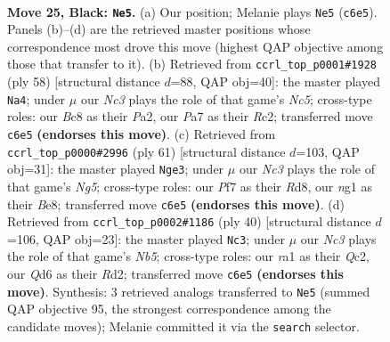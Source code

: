 \documentclass[11pt]{article}
\begin{document}
\clearpage

\begin{figure}[p]\centering
\begin{subfigure}{0.46\textwidth}\centering
\resizebox{\linewidth}{!}{%
\newchessgame
\chessboard[
  setfen={1rb1r1k1/p1p2pp1/2nq3p/p1n4P/2P5/2P1PQ2/6R1/R1B1KBN1 b Q - 3 25},
  showmover=false,
  pgfstyle=straightmove, color=movearrow, markmove={c6-e5}
]}
\caption{}
\end{subfigure}\hfill
\begin{subfigure}{0.46\textwidth}\centering
\resizebox{\linewidth}{!}{%
\newchessgame
\chessboard[
  setfen={r1b2r2/p1b1q1k1/2p3p1/2N1p3/4P2p/4Q2P/P1R1BPP1/5R1K w - - 8 30},
  showmover=false,
  pgfstyle=straightmove, color=movearrow, markmove={c5-a4}
]}
\caption{}
\end{subfigure}
\\[4pt]
\begin{subfigure}{0.46\textwidth}\centering
\resizebox{\linewidth}{!}{%
\newchessgame
\chessboard[
  setfen={3rb1k1/1p3pp1/pP2p3/P2n2q1/2R3n1/1NP3P1/1B2Q3/R4BK1 b - - 0 31},
  showmover=false,
  pgfstyle=straightmove, color=movearrow, markmove={g4-e3}
]}
\caption{}
\end{subfigure}\hfill
\begin{subfigure}{0.46\textwidth}\centering
\resizebox{\linewidth}{!}{%
\newchessgame
\chessboard[
  setfen={1rb2rk1/4b1p1/1q2p2p/pN2p3/2B1P2P/P6R/1PQR1PP1/4K3 w - - 4 21},
  showmover=false,
  pgfstyle=straightmove, color=movearrow, markmove={b5-c3}
]}
\caption{}
\end{subfigure}
\caption{\textbf{Move 25, Black: \texttt{Ne5}.} (a) Our position; Melanie plays \texttt{Ne5} (\texttt{c6e5}). Panels (b)--(d) are the retrieved master positions whose correspondence most drove this move (highest QAP objective among those that transfer to it). (b) Retrieved from \texttt{ccrl\_top\_p0001\#1928} (ply 58) [structural distance $d$=88, QAP obj=40]: the master played \texttt{Na4}; under $\mu$ our \emph{Nc3} plays the role of that game's \emph{Nc5}; cross-type roles: our \emph{B}c8 as their \emph{P}a2, our \emph{P}a7 as their \emph{R}c2; transferred move \texttt{c6e5} \textbf{(endorses this move)}. (c) Retrieved from \texttt{ccrl\_top\_p0000\#2996} (ply 61) [structural distance $d$=103, QAP obj=31]: the master played \texttt{Nge3}; under $\mu$ our \emph{Nc3} plays the role of that game's \emph{Ng5}; cross-type roles: our \emph{P}f7 as their \emph{R}d8, our \emph{n}g1 as their \emph{B}e8; transferred move \texttt{c6e5} \textbf{(endorses this move)}. (d) Retrieved from \texttt{ccrl\_top\_p0002\#1186} (ply 40) [structural distance $d$=106, QAP obj=23]: the master played \texttt{Nc3}; under $\mu$ our \emph{Nc3} plays the role of that game's \emph{Nb5}; cross-type roles: our \emph{r}a1 as their \emph{Q}c2, our \emph{Q}d6 as their \emph{R}d2; transferred move \texttt{c6e5} \textbf{(endorses this move)}. Synthesis: 3 retrieved analogs transferred to \texttt{Ne5} (summed QAP objective 95, the strongest correspondence among the candidate moves); Melanie committed it via the \texttt{search} selector.}
\label{fig:thought-m49}
\end{figure}
\end{document}
